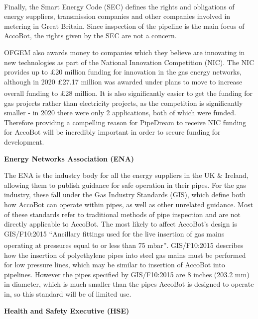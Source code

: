 \documentclass[11pt]{article}		%
\newcommand{\supercite}[1]{\textsuperscript{\cite{#1}}}		%
\begin{document}
			Finally, the Smart Energy Code (SEC)\supercite{smart2021smart} defines the rights and obligations of energy suppliers, transmission companies and other companies involved in metering in Great Britain.
			Since inspection of the pipeline is the main focus of AccoBot, the rights given by the SEC are not a concern.
			
			OFGEM also awards money to companies which they believe are innovating in new technologies as part of the National Innovation Competition (NIC).
			The NIC provides up to £20 million funding for innovation in the gas energy networks, although in 2020 £27.17 million was awarded under plans to move to increase overall funding to £28 million\supercite{ofgem2020nic}.
			It is also significantly easier to get the funding for gas projects rather than electricity projects, as the competition is significantly smaller - in 2020 there were only 2 applications, both of which were funded.
			Therefore providing a compelling reason for PipeDream to receive NIC funding for AccoBot will be incredibly important in order to secure funding for development.
			
			\textbf{Energy Networks Association (ENA)}
			
			The ENA is the industry body for all the energy suppliers in the UK \& Ireland, allowing them to publish guidance for safe operation in their pipes.
			For the gas industry, these fall under the Gas Industry Standards (GIS), which define both how AccoBot can operate within pipes, as well as other unrelated guidance.
			Most of these standards refer to traditional methods of pipe inspection and are not directly applicable to AccoBot.
			The most likely to affect AccoBot's design is GIS/F10:2015 “Ancillary fittings used for the live insertion of gas mains operating at pressures equal to or less than 75 mbar”\supercite{energy2015gas}.
			GIS/F10:2015 describes how the insertion of polyethylene pipes into steel gas mains must be performed for low pressure lines, which may be similar to insertion of AccoBot into pipelines.
			However the pipes specified by 	GIS/F10:2015 are 8 inches (203.2 mm) in diameter, which is much smaller than the pipes AccoBot is designed to operate in, so this standard will be of limited use.
			
			\textbf{Health and Safety Executive (HSE)}
			
\end{document}
